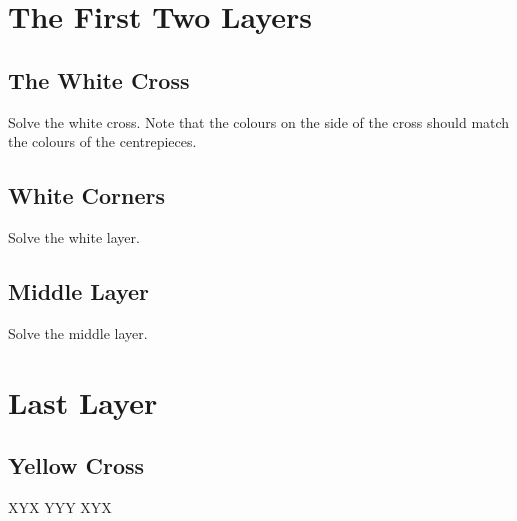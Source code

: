 \documentclass{article}
\begin{document}
    \section{The First Two Layers}

    \subsection{The White Cross}

    \RubikCubeGreyWY

    \begin{goal}
        Solve the white cross.
        Note that the colours on the side of the cross should match the colours of the centrepieces.
    \end{goal}


    \subsection{White Corners}

    \RubikCubeGreyWY

    \begin{goal}
        Solve the white layer.
    \end{goal}


    \subsection{Middle Layer}

    \RubikCubeGreyWY

    \begin{goal}
        Solve the middle layer.
    \end{goal}


    \section{Last Layer}

    \subsection{Yellow Cross}

    \RubikCubeGreyAll
    \RubikFaceUp XYX YYY XYX
\end{document}
